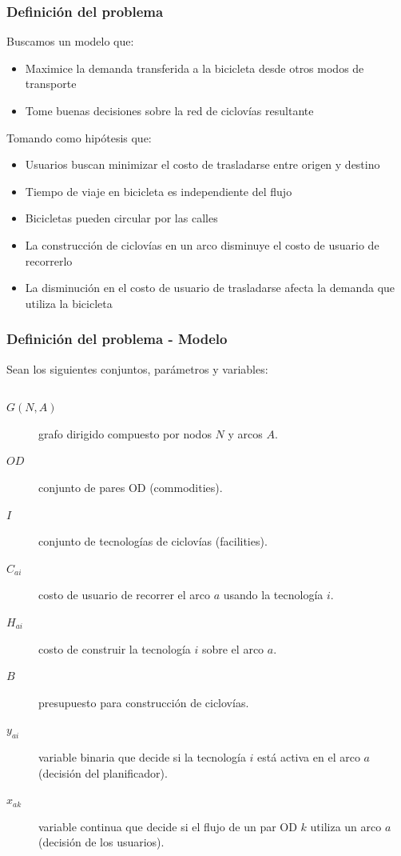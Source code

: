 \documentclass[aspectratio=43, 10pt]{beamer}
\begin{document}
\begin{frame}
    \frametitle{Definición del problema}

    Buscamos un modelo que:

    \begin{itemize}
        \item{Maximice la demanda transferida a la bicicleta desde otros modos de transporte}
        \item{Tome buenas decisiones sobre la red de ciclovías resultante}
    \end{itemize}

    Tomando como hipótesis que:

    \begin{itemize}
        \item{Usuarios buscan minimizar el costo de trasladarse entre origen y destino}
        \item{Tiempo de viaje en bicicleta es independiente del flujo}
        \item{Bicicletas pueden circular por las calles}
        \item{La construcción de ciclovías en un arco disminuye el costo de usuario de recorrerlo}
        \item{La disminución en el costo de usuario de trasladarse afecta la demanda que utiliza la bicicleta}
    \end{itemize}
\end{frame}

\begin{frame}
    \frametitle{Definición del problema - Modelo}

    Sean los siguientes conjuntos, parámetros y variables:

    \begin{columns}[c]
    \begin{description}
        \item[$G(N,A)$] grafo dirigido compuesto por nodos $N$ y arcos $A$.
        \item[$OD$] conjunto de pares OD (commodities).
        \item[$I$] conjunto de tecnologías de ciclovías (facilities).
        \item[$C_{ai}$] costo de usuario de recorrer el arco $a$ usando la tecnología $i$.
        \item[$H_{ai}$] costo de construir la tecnología $i$ sobre el arco $a$.
        \item[$B$] presupuesto para construcción de ciclovías.
        \item[$y_{ai}$] variable binaria que decide si la tecnología $i$ está activa en el arco $a$ (decisión del planificador).
        \item[$x_{ak}$] variable continua que decide si el flujo de un par OD $k$ utiliza un arco $a$ (decisión de los usuarios).
    \end{description}
    \end{columns}
\end{frame}
\end{document}

